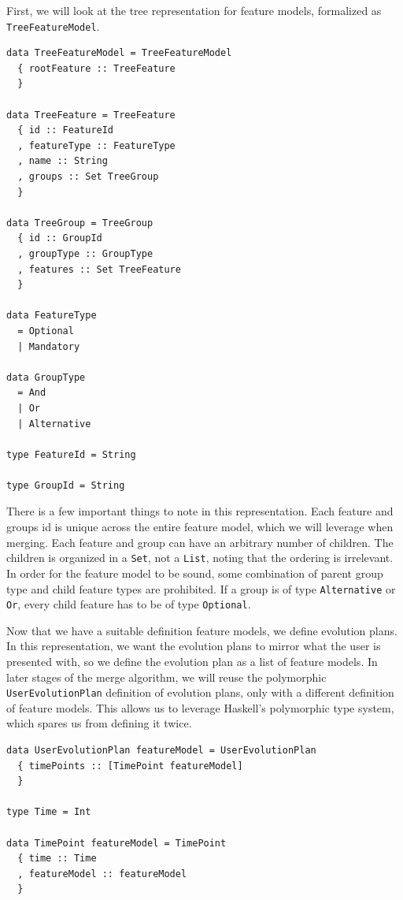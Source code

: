 \documentclass[a4paper,english]{ifimaster}
\begin{document}
First, we will look at the tree representation for feature models, formalized as \texttt{TreeFeatureModel}.

\begin{verbatim}
data TreeFeatureModel = TreeFeatureModel
  { rootFeature :: TreeFeature
  }

data TreeFeature = TreeFeature
  { id :: FeatureId
  , featureType :: FeatureType
  , name :: String
  , groups :: Set TreeGroup
  }

data TreeGroup = TreeGroup
  { id :: GroupId
  , groupType :: GroupType
  , features :: Set TreeFeature
  }

data FeatureType
  = Optional
  | Mandatory

data GroupType
  = And
  | Or
  | Alternative

type FeatureId = String

type GroupId = String
\end{verbatim}

There is a few important things to note in this representation. Each feature and groups id is unique across the entire feature model, which we will leverage when merging. Each feature and group can have an arbitrary number of children. The children is organized in a \texttt{Set}, not a \texttt{List}, noting that the ordering is irrelevant. In order for the feature model to be sound, some combination of parent group type and child feature types are prohibited. If a group is of type \texttt{Alternative} or \texttt{Or}, every child feature has to be of type \texttt{Optional}.

Now that we have a suitable definition feature models, we define evolution plans. In this representation, we want the evolution plans to mirror what the user is presented with, so we define the evolution plan as a list of feature models. In later stages of the merge algorithm, we will reuse the polymorphic \texttt{UserEvolutionPlan} definition of evolution plans, only with a different definition of feature models. This allows us to leverage Haskell's polymorphic type system, which spares us from defining it twice.

\begin{verbatim}
data UserEvolutionPlan featureModel = UserEvolutionPlan
  { timePoints :: [TimePoint featureModel]
  }

type Time = Int

data TimePoint featureModel = TimePoint
  { time :: Time
  , featureModel :: featureModel
  }
\end{verbatim}
\end{document}

